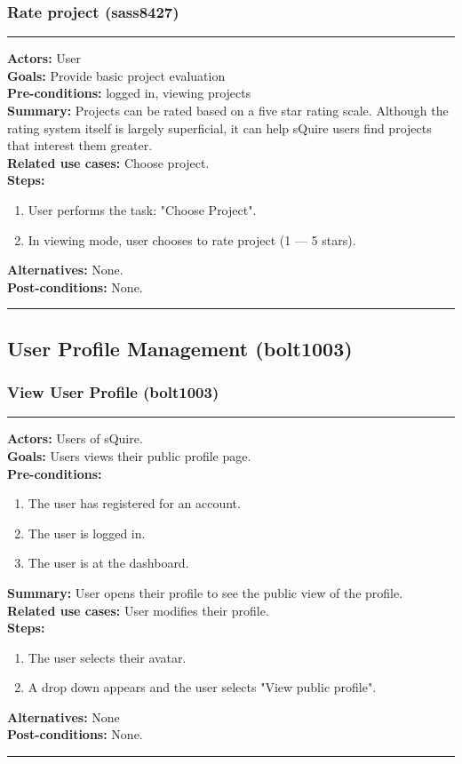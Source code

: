 \documentclass[11pt]{report}
\begin{document}
\subsubsection{Rate project (sass8427)}
\vspace{2pt}
\hrule
\vspace{8pt}
 \textbf{Actors:} User \\ 
 \textbf{Goals:} Provide basic project evaluation \\
 \textbf{Pre-conditions:} logged in, viewing projects \\
\textbf{Summary:} Projects can be rated based on a five star rating scale. Although the rating system itself is largely superficial, it can help sQuire users find projects that interest them greater. \\ 
 \textbf{Related use cases:} Choose project.\\ 
 \textbf{Steps:} \begin{enumerate}
  \item User performs the task: "Choose Project". 
  \item In viewing mode, user chooses to rate project (1 --- 5 stars).
 \end{enumerate}
 \textbf{Alternatives:} None. \\
 \textbf{Post-conditions:} None. \\
 \vspace{8pt}
\hrule
\newpage
\subsection{User Profile Management (bolt1003)}
\subsubsection{View User Profile (bolt1003)}
\vspace{2pt}
\hrule
\vspace{8pt}
 \textbf{Actors:} Users of sQuire. \\ 
 \textbf{Goals:} Users views their public profile page. \\
 \textbf{Pre-conditions:} \begin{enumerate}
  \item The user has registered for an account.
  \item The user is logged in.
  \item The user is at the dashboard.
 \end{enumerate}
 \textbf{Summary:} User opens their profile to see the public view of the profile.\\ 
 \textbf{Related use cases:} User modifies their profile. \\ 
 \textbf{Steps:} \begin{enumerate}
  \item The user selects their avatar.
  \item A drop down appears and the user selects "View public profile".
 \end{enumerate}
 \textbf{Alternatives:} None \\
 \textbf{Post-conditions:} None. \\
 \vspace{8pt}
\hrule
\newpage
\end{document}
